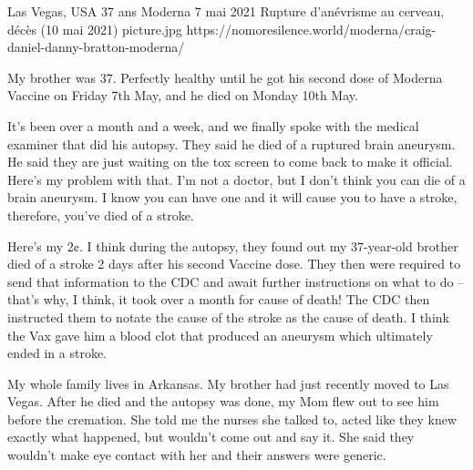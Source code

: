           {Las Vegas, USA}
          {37 ans}
          {Moderna}
          {7 mai 2021}
          {Rupture d'anévrisme au cerveau, décès (10 mai 2021)}
          {picture.jpg}
          {https://nomoresilence.world/moderna/craig-daniel-danny-bratton-moderna/}
          {

My brother was 37. Perfectly healthy until he got his second dose of Moderna
Vaccine on Friday 7th May, and he died on Monday 10th May.

It’s been over a month and a week, and we finally spoke with the medical
examiner that did his autopsy. They said he died of a ruptured brain
aneurysm. He said they are just waiting on the tox screen to come back to make
it official. Here’s my problem with that. I’m not a doctor, but I don’t think
you can die of a brain aneurysm. I know you can have one and it will cause you
to have a stroke, therefore, you’ve died of a stroke.

Here’s my 2¢. I think during the autopsy, they found out my 37-year-old brother
died of a stroke 2 days after his second Vaccine dose. They then were required
to send that information to the CDC and await further instructions on what to do
– that’s why, I think, it took over a month for cause of death! The CDC then
instructed them to notate the cause of the stroke as the cause of death. I think
the Vax gave him a blood clot that produced an aneurysm which ultimately ended
in a stroke.

My whole family lives in Arkansas. My brother had just recently moved to Las
Vegas. After he died and the autopsy was done, my Mom flew out to see him before
the cremation. She told me the nurses she talked to, acted like they knew
exactly what happened, but wouldn’t come out and say it. She said they wouldn’t
make eye contact with her and their answers were generic.

}
